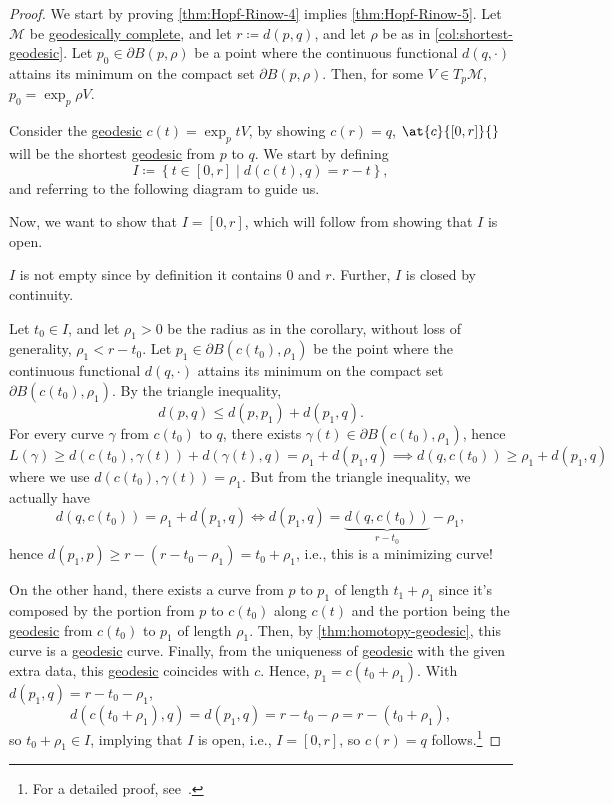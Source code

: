 \begin{proof}\let\qed\relax
	We start by proving \autoref{thm:Hopf-Rinow-4} implies \autoref{thm:Hopf-Rinow-5}. Let \(\mathcal{M} \) be \hyperref[def:geodesically-complete]{geodesically complete}, and let \(r \coloneqq d(p, q)\), and let \(\rho \) be as in \autoref{col:shortest-geodesic}. Let \(p_0 \in \partial B(p, \rho )\) be a point where the continuous functional \(d(q, \cdot)\) attains its minimum on the compact set \(\partial B(p, \rho )\). Then, for some \(V \in T_p \mathcal{M} \), \(p_0 = \exp _p \rho V\).

	Consider the \hyperref[def:geodesic]{geodesic} \(c(t) = \exp _p tV\), by showing \(c(r) = q\), \(\at{c}{[0, r]}{} \) will be the shortest \hyperref[def:geodesic]{geodesic} from \(p\) to \(q\). We start by defining
	\[
		I\coloneqq \left\{ t\in[0, r] \mid d(c(t), q) = r-t \right\},
	\]
	and referring to the following diagram to guide us.
	\begin{center}
	\end{center}

	Now, we want to show that \(I = [0, r]\), which will follow from showing that \(I\) is open.
	\begin{note}
		\(I\) is not empty since by definition it contains \(0\) and \(r\). Further, \(I\) is closed by continuity.
	\end{note}
	Let \(t_0 \in I\), and let \(\rho _1 > 0\) be the radius as in the corollary, without loss of generality, \(\rho _1 < r-t_0\). Let \(p_1\in \partial B(c(t_0), \rho _1)\) be the point where the continuous functional \(d(q, \cdot)\) attains its minimum on the compact set \(\partial B(c(t_0), \rho _1)\). By the triangle inequality,
	\[
		d(p, q) \leq d(p, p_1) + d(p_1, q).
	\]
	For every curve \(\gamma \) from \(c(t_0)\) to \(q\), there exists \(\gamma (t)\in \partial B(c(t_0), \rho _1)\), hence
	\[
		L(\gamma )
		\geq d(c(t_0), \gamma (t)) + d(\gamma (t), q)
		= \rho _1 + d(p_1, q)
		\implies d(q, c(t_0)) \geq \rho _1 + d(p_1, q)
	\]
	where we use \(d(c(t_0), \gamma (t)) = \rho _1\). But from the triangle inequality, we actually have
	\[
		d(q, c(t_0)) = \rho _1 + d(p_1, q)
		\iff d(p_1, q) = \underbrace{d(q, c(t_0))}_{r-t_0} - \rho _1,
	\]
	hence \(d(p_1, p) \geq r-(r-t_0 - \rho _1) = t_0 + \rho _1\), i.e., this is a minimizing curve!

	On the other hand, there exists a curve from \(p\) to \(p_1\) of length \(t_1 + \rho _1\) since it's composed by the portion from \(p\) to \(c(t_0)\) along \(c(t)\) and the portion being the \hyperref[def:geodesic]{geodesic} from \(c(t_0)\) to \(p_1\) of length \(\rho _1\). Then, by \autoref{thm:homotopy-geodesic}, this curve is a \hyperref[def:geodesic]{geodesic} curve. Finally, from the uniqueness of \hyperref[def:geodesic]{geodesic} with the given extra data, this \hyperref[def:geodesic]{geodesic} coincides with \(c\). Hence, \(p_1 = c ( t_0 + \rho _1)\). With \(d(p_1, q) = r-t_0 - \rho _1\),
	\[
		d(c(t_0 + \rho _1), q)
		= d(p_1, q)
		= r - t_0 - \rho
		= r-(t_0 + \rho _1),
	\]
	so \(t_0 + \rho _1\in I\), implying that \(I\) is open, i.e., \(I = [0, r]\), so \(c(r) = q\) follows.\footnote{For a detailed proof, see~\cite[Corollary 3.9]{flaherty2013riemannian}.}
\end{proof}